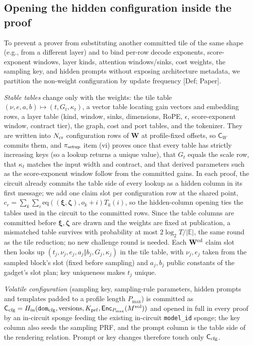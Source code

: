\documentclass[10pt]{article}
\begin{document}
\subsection{Opening the hidden configuration inside the proof}
To prevent a prover from substituting another committed tile of the same shape (e.g., from a different layer) and to bind per-row decode exponents, score-exponent windows, layer kinds, attention windows/sinks, cost weights, the sampling key, and hidden prompts without exposing architecture metadata, we partition the non-weight configuration by update frequency [Def; Paper].

\emph{Stable tables} change only with the weights: the tile table $(\nu,e,a,b)\mapsto(t,G_t,\kappa_t)$, a vector table locating gain vectors and embedding rows, a layer table (kind, window, sinks, dimensions, RoPE, $\epsilon$, score-exponent window, contract tier), the graph, cost and port tables, and the tokenizer. They are written into $N_{\rm cr}$ configuration rows of $\mathbf W$ at profile-fixed offsets, so $\mathsf C_W$ commits them, and $\pi_{\rm setup}$ item (vi) proves once that every table has strictly increasing keys (so a lookup returns a unique value), that $G_t$ equals the scale row, that $\kappa_t$ matches the input width and contract, and that derived parameters such as the score-exponent window follow from the committed gains. In each proof, the circuit already commits the table side of every lookup as a hidden column in its first message; we add one claim slot per configuration row at the shared point, $c_r=\sum_k\sum_i\mathrm{eq}((\boldsymbol\xi,\boldsymbol\zeta),o_k+i)T_k(i)$, so the hidden-column opening ties the tables used in the circuit to the committed rows. Since the table columns are committed before $\boldsymbol\xi,\boldsymbol\zeta$ are drawn and the weights are fixed at publication, a mismatched table survives with probability at most $2\log_2T/\lvert\mathbb E\rvert$, the same round as the tile reduction; no new challenge round is needed. Each $\mathbf W^{\rm cd}$ claim slot then looks up $(t_j,\nu_j,e_j,a_j\Vert b_j,G_j,\kappa_j)$ in the tile table, with $\nu_j,e_j$ taken from the sampled block's slot (fixed before sampling) and $a_j,b_j$ public constants of the gadget's slot plan; key uniqueness makes $t_j$ unique.

\emph{Volatile configuration} (sampling key, sampling-rule parameters, hidden prompts and templates padded to a profile length $P_{\max}$) is committed as $\mathsf C_{\rm cfg}=H_{\rm in}(\texttt{dom}_{\rm cfg},\text{versions},K_{\rm prf},\mathsf{Enc}_{P_{\max}}(M^{\rm vol}))$ and opened in full in every proof by an in-circuit sponge feeding the existing in-circuit \texttt{model\_\allowbreak{}id} sponge; the key column also seeds the sampling PRF, and the prompt column is the table side of the rendering relation. Prompt or key changes therefore touch only $\mathsf C_{\rm cfg}$.
\end{document}
